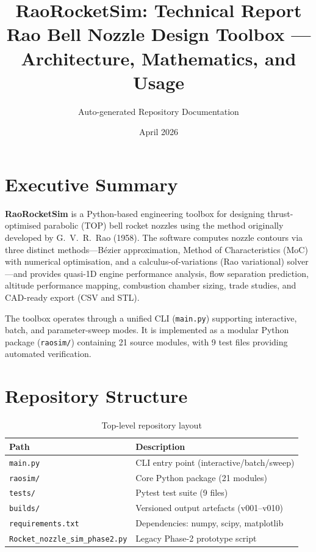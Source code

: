 \documentclass[11pt,a4paper]{article}
\title{\textbf{RaoRocketSim: Technical Report}\\[0.3em]
\large Rao Bell Nozzle Design Toolbox --- Architecture, Mathematics, and Usage}
\author{Auto-generated Repository Documentation}
\date{April 2026}
\begin{document}
\maketitle
\tableofcontents
\newpage

\section{Executive Summary}

\textbf{RaoRocketSim} is a Python-based engineering toolbox for designing thrust-optimised parabolic (TOP) bell rocket nozzles using the method originally developed by G.~V.~R.\ Rao (1958). The software computes nozzle contours via three distinct methods---B\'ezier approximation, Method of Characteristics (MoC) with numerical optimisation, and a calculus-of-variations (Rao variational) solver---and provides quasi-1D engine performance analysis, flow separation prediction, altitude performance mapping, combustion chamber sizing, trade studies, and CAD-ready export (CSV and STL).

The toolbox operates through a unified CLI (\texttt{main.py}) supporting interactive, batch, and parameter-sweep modes. It is implemented as a modular Python package (\texttt{raosim/}) containing 21 source modules, with 9 test files providing automated verification.

\section{Repository Structure}

\begin{table}[H]
\centering\small
\caption{Top-level repository layout}
\begin{tabular}{@{}ll@{}}
\toprule
\textbf{Path} & \textbf{Description} \\
\midrule
\texttt{main.py} & CLI entry point (interactive/batch/sweep) \\
\texttt{raosim/} & Core Python package (21 modules) \\
\texttt{tests/} & Pytest test suite (9 files) \\
\texttt{builds/} & Versioned output artefacts (v001--v010) \\
\texttt{requirements.txt} & Dependencies: numpy, scipy, matplotlib \\
\texttt{Rocket\_nozzle\_sim\_phase2.py} & Legacy Phase-2 prototype script \\
\bottomrule
\end{tabular}
\end{table}
\end{document}

